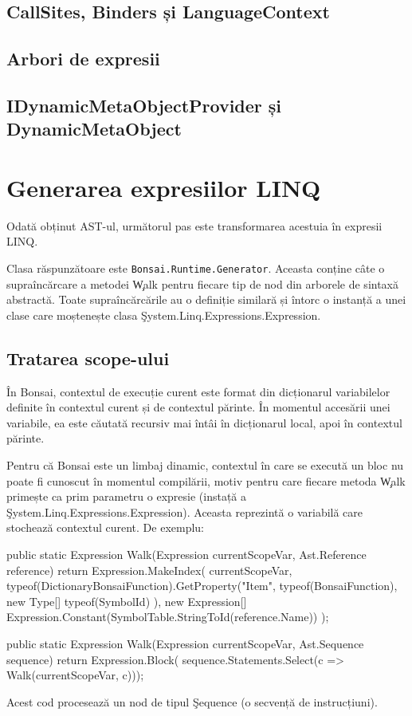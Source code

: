 \documentclass[12pt,a4paper]{memoir}
\begin{document}

\subsection{CallSites, Binders și LanguageContext}

\subsection{Arbori de expresii}

\subsection{IDynamicMetaObjectProvider și DynamicMetaObject}

\section{Generarea expresiilor LINQ}

Odată obținut AST-ul, următorul pas este transformarea acestuia în expresii LINQ\cite{linq_expressions}. 

Clasa răspunzătoare este \texttt{Bonsai.Runtime.Generator}. Aceasta conține câte o supraîncărcare a metodei \c{Walk} pentru fiecare tip de nod din arborele de sintaxă abstractă. Toate supraîncărcările au o definiție similară și întorc o instanță a unei clase care moștenește clasa \c{System.Linq.Expressions.Expression}.

\subsection{Tratarea scope-ului} 

În Bonsai, contextul de execuție curent este format din dicționarul variabilelor definite în contextul curent și de contextul părinte. În momentul accesării unei variabile, ea este căutată recursiv mai întâi în dicționarul local, apoi în contextul părinte. 

Pentru că Bonsai este un limbaj dinamic, contextul în care se execută un bloc nu poate fi cunoscut în momentul compilării, motiv pentru care fiecare metoda \c{Walk} primește ca prim parametru o expresie (instață a \c{System.Linq.Expressions.Expression}). Aceasta reprezintă o variabilă care stochează contextul curent. De exemplu:
\begin{code}
public static Expression Walk(Expression currentScopeVar, Ast.Reference reference) {
            return Expression.MakeIndex(
                currentScopeVar,
                typeof(DictionaryBonsaiFunction).GetProperty("Item", 
                    typeof(BonsaiFunction), new Type[] { typeof(SymbolId) }), 
                new Expression[] { Expression.Constant(SymbolTable.StringToId(reference.Name)) });
        }

        public static Expression Walk(Expression currentScopeVar, Ast.Sequence sequence) {
            return Expression.Block(
                sequence.Statements.Select(c => Walk(currentScopeVar, c)));
        }

\end{code}
Acest cod procesează un nod de tipul \c{Sequence} (o secvență de instrucțiuni).
\end{document}
